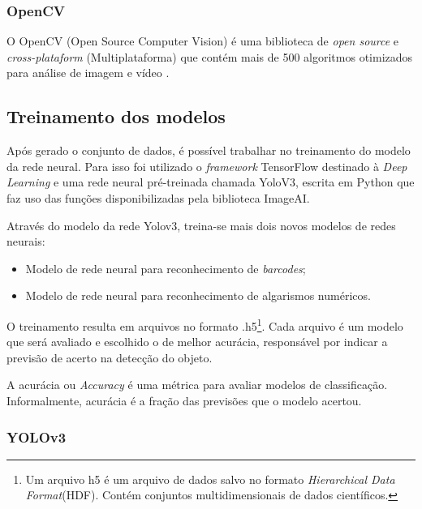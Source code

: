
\subsubsection{OpenCV}

O OpenCV (Open Source Computer Vision) é uma biblioteca de \textit{open source} e \textit{cross-plataform} (Multiplataforma) que contém mais de 500 algoritmos otimizados para análise de imagem e vídeo \cite{opencv}.


\subsection{Treinamento dos modelos}

Após gerado o conjunto de dados, é possível trabalhar no treinamento do modelo da rede neural. Para isso foi utilizado o \textit{framework} TensorFlow destinado à \textit{Deep Learning} e uma rede neural pré-treinada chamada YoloV3, escrita em Python que faz uso das funções disponibilizadas pela biblioteca ImageAI.

Através do modelo da rede Yolov3, treina-se mais dois novos modelos de redes neurais:
\begin{itemize}
    \item Modelo de rede neural para reconhecimento de \textit{barcodes};
    \item Modelo de rede neural para reconhecimento de algarismos numéricos.
\end{itemize}

O treinamento resulta em arquivos no formato .h5\footnote{Um arquivo h5 é um arquivo de dados salvo no formato \textit{Hierarchical Data Format}(HDF). Contém conjuntos multidimensionais de dados científicos.}. Cada arquivo é um modelo que será avaliado e escolhido o de melhor acurácia, responsável por indicar a previsão de acerto na detecção do objeto. 

A acurácia ou \textit{Accuracy} é uma métrica para avaliar modelos de classificação. Informalmente, acurácia é a fração das previsões que o modelo acertou. 


\subsubsection*{YOLOv3}\label{sub:Yolov3}

